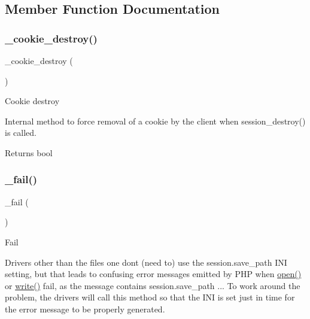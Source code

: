 \subsection{Member Function Documentation}
\mbox{\label{class_c_i___session__driver_a36771b622e8a8928c1c931ac56c12434}} 
\subsubsection{\texorpdfstring{\+\_\+cookie\+\_\+destroy()}{\_cookie\_destroy()}}
{\footnotesize\ttfamily \+\_\+cookie\+\_\+destroy (\begin{DoxyParamCaption}{ }\end{DoxyParamCaption})\hspace{0.3cm}{\ttfamily [protected]}}

Cookie destroy

Internal method to force removal of a cookie by the client when session\+\_\+destroy() is called.

\begin{DoxyReturn}{Returns}
bool 
\end{DoxyReturn}
\mbox{\label{class_c_i___session__driver_a1b1bf5bb9cba50e84f985c30f6b64773}} 
\subsubsection{\texorpdfstring{\+\_\+fail()}{\_fail()}}
{\footnotesize\ttfamily \+\_\+fail (\begin{DoxyParamCaption}{ }\end{DoxyParamCaption})\hspace{0.3cm}{\ttfamily [protected]}}

Fail

Drivers other than the \textquotesingle{}files\textquotesingle{} one don\textquotesingle{}t (need to) use the session.\+save\+\_\+path I\+NI setting, but that leads to confusing error messages emitted by P\+HP when \mbox{\hyperlink{interface_session_handler_interface_a614b5cf3840833913c7a73260ed28e02}{open()}} or \mbox{\hyperlink{interface_session_handler_interface_ad9d124885be93668f1dbf6aace5964f5}{write()}} fail, as the message contains session.\+save\+\_\+path ... To work around the problem, the drivers will call this method so that the I\+NI is set just in time for the error message to be properly generated.

